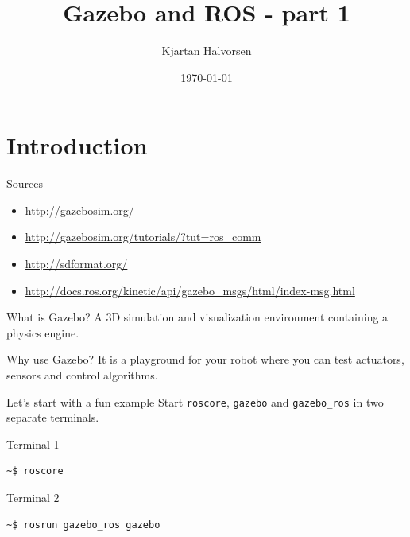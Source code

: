\documentclass[presentation,aspectratio=1610]{beamer}
\author{Kjartan Halvorsen}
\date{\today}
\title{Gazebo and ROS  - part 1}
\begin{document}
\maketitle

\section{Introduction}
\label{sec:org2109fbd}

\begin{frame}[label={sec:orge30a877}]{Sources}
\begin{itemize}
\item \url{http://gazebosim.org/}
\item \url{http://gazebosim.org/tutorials/?tut=ros\_comm}
\item \url{http://sdformat.org/}
\item \url{http://docs.ros.org/kinetic/api/gazebo\_msgs/html/index-msg.html}
\end{itemize}
\end{frame}

\begin{frame}[label={sec:orgf77e2fd}]{What is Gazebo?}
A 3D simulation and visualization environment containing a physics engine.
\end{frame}

\begin{frame}[label={sec:org45cd4bc}]{Why use Gazebo?}
It is a playground for your robot where you can test \alert{actuators}, \alert{sensors} and \alert{control algorithms}.
\end{frame}

\begin{frame}[label={sec:org20f4007},fragile]{Let's start with a fun example}
 Start \texttt{roscore}, \texttt{gazebo} and \texttt{gazebo\_ros} in two separate terminals.

\begin{block}{Terminal 1}
\begin{verbatim}
~$ roscore 
\end{verbatim}
\end{block}

\begin{block}{Terminal 2}
\begin{verbatim}
~$ rosrun gazebo_ros gazebo
\end{verbatim}
\end{block}
\end{frame}
\end{document}
